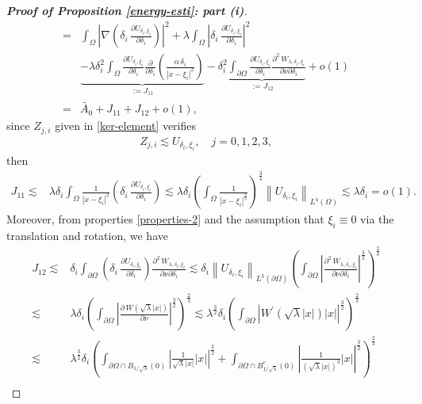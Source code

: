 \documentclass[a4paper,reqno,11pt,oneside]{amsart}
\numberwithin{equation}{section}
\begin{document}
\begin{proof}[\textbf{Proof of Proposition \eqref{energy-esti}: part (i)}]
\begin{align*}
   =&\displaystyle\int_{\Omega}\left|\nabla\left(\delta_i\,\frac{\partial U_{\delta_i,\xi_i}}{\partial \delta_i}\right)\right|^2+\lambda\displaystyle\int_{\Omega}\left|\delta_i\,\frac{\partial U_{\delta_i,\xi_i}}{\partial \delta_i}\right|^2\\&\underbrace{-\lambda\delta_i^2\displaystyle\int_{\Omega}\frac{\partial U_{\delta_i,\xi_i}}{\partial \delta_i}\frac{\partial}{\partial \delta_i}\left(\frac{\alpha\,\delta_i}{|x-\xi_i|^{2}}\right)}_{:=J_{11}}-\underbrace{\delta_i^2\displaystyle\int_{\partial\Omega}\frac{\partial U_{\delta_i,\xi_i}}{\partial \delta_i}\frac{\partial^2\,W_{\lambda,\delta_i,\xi_i}}{\partial{\nu}\partial \delta_i}}_{:=J_{12}}+o(1)\\=& \widetilde{A_0}+J_{11}+J_{12}+o(1),
\end{align*}
since $Z_{j,i}$ given in \eqref{ker-element} verifies
\begin{align*}
   Z_{j,i}\lesssim U_{\delta_i,\xi_i},\quad j=0,1,2,3,
\end{align*}
then
\begin{align*}
J_{11}\lesssim&\lambda\delta_i\displaystyle\int_{\Omega}\frac{1}{|x-\xi_i|^{2}}\left(\delta_i\,\frac{\partial U_{\delta_i,\xi_i}}{\partial \delta_i}\right)\lesssim\lambda\delta_i\left(\displaystyle\int_{\Omega}\frac{1}{|x-\xi_i|^{\frac{8}{3}}}\right)^{\frac{3}{4}}\left\|U_{\delta_i,\xi_i}\right\|_{L^4(\Omega)}\lesssim\lambda\delta_i=o(1).
\end{align*}
Moreover, from properties \eqref{properties-2} and {the assumption that $\xi_i\equiv 0$ via the translation and rotation}, we have
\begin{align*}
    J_{12}\lesssim&\delta_i\displaystyle\int_{\partial\Omega}\left(\delta_i\,\frac{\partial U_{\delta_i,\xi_i}}{\partial \delta_i}\right)\frac{\partial^2\,W_{\lambda,\delta_i,\xi_i}}{\partial{\nu}\partial \delta_i}\lesssim\delta_i\left\|U_{\delta_i,\xi_i}\right\|_{L^3(\partial\Omega)}\left(\displaystyle\int_{\partial\Omega}\left|\frac{\partial^2\,W_{\lambda,\delta_i,\xi_i}}{\partial{\nu}\partial \delta_i}\right|^{\frac{3}{2}}\right)^{\frac{2}{3}}\\
    \lesssim&\lambda\delta_i\left(\displaystyle\int_{\partial\Omega}\left|\frac{\partial\,W(\sqrt{\lambda}|x|)}{\partial{\nu}}\right|^{\frac{3}{2}}\right)^{\frac{2}{3}}\lesssim\lambda^{\frac{3}{2}}\delta_i\left(\displaystyle\int_{\partial\Omega}\left|W^{\prime}(\sqrt{\lambda}|x|)|x|\right|^{\frac{3}{2}}\right)^{\frac{2}{3}}\\
    \lesssim&\lambda^{\frac{3}{2}}\delta_i\left(\displaystyle\int_{\partial\Omega\cap B_{1/\sqrt{\lambda}}(0)}\left|\frac{1}{\sqrt{\lambda}|x|}|x|\right|^{\frac{3}{2}}+\displaystyle\int_{\partial\Omega\cap B^{c}_{1/\sqrt{\lambda}}(0)}\left|\frac{1}{\left(\sqrt{\lambda}|x|\right)^3}|x|\right|^{\frac{3}{2}}\right)^{\frac{2}{3}}\\

\end{align*}
\end{proof}
\end{document}
